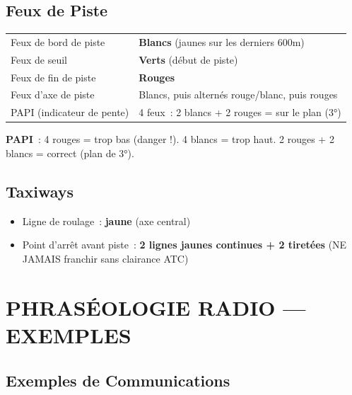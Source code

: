 \subsection{Feux de Piste}

\begin{tabular}{p{4cm}p{10.5cm}}
\toprule
Feux de bord de piste & \textbf{Blancs} (jaunes sur les derniers 600m) \\
Feux de seuil & \textbf{Verts} (début de piste) \\
Feux de fin de piste & \textbf{Rouges} \\
Feux d'axe de piste & Blancs, puis alternés rouge/blanc, puis rouges \\
PAPI (indicateur de pente) & 4 feux~: 2 blancs + 2 rouges = sur le plan (3°) \\
\bottomrule
\end{tabular}

\begin{memobox}
\textbf{PAPI}~: 4 rouges = trop bas (danger !). 4 blancs = trop haut. 2 rouges + 2 blancs = correct (plan de 3°).
\end{memobox}

\subsection{Taxiways}
\begin{itemize}[nosep]
\item Ligne de roulage~: \textbf{jaune} (axe central)
\item Point d'arrêt avant piste~: \textbf{2 lignes jaunes continues + 2 tiretées} (NE JAMAIS franchir sans clairance ATC)
\end{itemize}

\section{PHRASÉOLOGIE RADIO --- EXEMPLES}

\subsection{Exemples de Communications}

